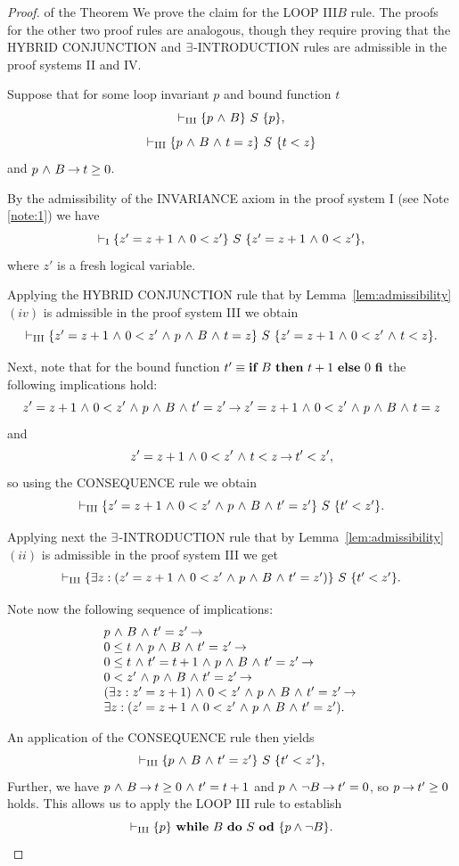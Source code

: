\documentclass[manuscript, screen, review]{acmart}
\begin{document}
\begin{proof} of the Theorem
  We prove the claim for the LOOP III$B$ rule. The proofs for the
  other two proof rules are analogous, though they require proving
  that the HYBRID CONJUNCTION and $\te$-INTRODUCTION rules are
  admissible in the proof systems II and IV.

  Suppose that for some loop invariant $p$ and bound function $t$
\[
\vdash_{\rm{III}}  \HT{p \A B}{S}{p},
\]
\[
\vdash_{\rm{III}}  \HT{p \A B \A t=z}{S}{t<z}
\]
and
$p \A B \ra t \geq 0$.

By the admissibility of the INVARIANCE axiom in the proof system I (see Note \ref{note:1})
we have
\[
\vdash_{\rm{I}}  \HT{z' = z+1 \A 0 < z'}{S}{z' = z+1 \A 0 < z'},
\]
where $z'$ is a fresh logical variable.

Applying the HYBRID CONJUNCTION rule that by Lemma~\ref{lem:admissibility}$(iv)$
is admissible in the proof system III
we obtain
\[
  \vdash_{\rm{III}}  \HT{z' = z+1 \A 0 < z' \A p \A B \A t=z}{S}{z' = z+1 \A 0 < z' \A t<z}.
\]

Next, note that for the bound function $t' \equiv \ITE{B}{t+1}{0}$
the following implications hold:
\[
  z' = z+1 \A 0 < z' \A p \A B \A t'=z' \ra
    z' = z+1 \A 0 < z' \A p \A B \A t=z
\]
and
\[
  z' = z+1 \A 0 < z' \A t<z \ra t' < z',
\]
so using the CONSEQUENCE rule we obtain
\[
  \vdash_{\rm{III}}  \HT{z' = z+1 \A 0 < z' \A p \A B \A t'=z'}{S}{t'<z'}.
\]

Applying next the $\te$-INTRODUCTION rule that by Lemma~\ref{lem:admissibility}$(ii)$
is admissible in the proof system III we get
\[
  \vdash_{\rm{III}}  \HT{\te z: (z' = z+1 \A 0 < z' \A p \A B \A t'=z')}{S}{t'<z'}.
\]

Note now the following sequence of implications:
\[
  \begin{array}{l}
    p \A B \A t'=z' \ra \\
    0 \leq t \A p \A B \A t'=z' \ra \\
    0 \leq t \A t' = t+1 \A p \A B \A t'=z' \ra \\
    0 < z' \A p \A B \A t'=z' \ra \\
    (\te z: z' = z+1) \A 0 < z' \A p \A B \A t'=z'  \ra \\
    \te z: (z' = z+1 \A 0 < z' \A p \A B \A t'=z'). 
  \end{array}
\]

An application of the CONSEQUENCE rule then yields
\[
\vdash_{\rm{III}}  \HT{p \A B \A t'=z'}{S}{t'<z'},
\]
Further, we have $p \A B \ra t \geq 0 \A t' = t+1$ and 
$p \A \neg B \ra t' = 0$, so 
$p \ra t' \geq 0$ holds.
This allows us to apply the LOOP III rule to establish
\[
\vdash_{\rm{III}}  \HT{p}{\WDD{B}{S}}{p \wedge \neg B}.
\]
\end{proof}

%
\end{document}
